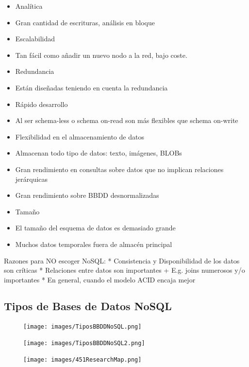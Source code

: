\documentclass[]{book}
\providecommand{\tightlist}{%
  \setlength{\itemsep}{0pt}\setlength{\parskip}{0pt}}
\begin{document}
\begin{itemize}
\tightlist
\item
  Analítica
\item
  Gran cantidad de escrituras, análisis en bloque
\item
  Escalabilidad
\item
  Tan fácil como añadir un nuevo nodo a la red, bajo coste.
\item
  Redundancia
\item
  Están diseñadas teniendo en cuenta la redundancia
\item
  Rápido desarrollo
\item
  Al ser schema-less o schema on-read son más flexibles que schema
  on-write
\item
  Flexibilidad en el almacenamiento de datos
\item
  Almacenan todo tipo de datos: texto, imágenes, BLOBs
\item
  Gran rendimiento en consultas sobre datos que no implican relaciones
  jerárquicas
\item
  Gran rendimiento sobre BBDD desnormalizadas
\item
  Tamaño
\item
  El tamaño del esquema de datos es demasiado grande
\item
  Muchos datos temporales fuera de almacén principal
\end{itemize}

Razones para NO escoger NoSQL: * Consistencia y Disponibilidad de los
datos son críticas * Relaciones entre datos son importantes + E.g. joins
numerosos y/o importantes * En general, cuando el modelo ACID encaja
mejor

\subsection{Tipos de Bases de Datos
NoSQL}\label{tipos-de-bases-de-datos-nosql}

\begin{figure}
\centering
\texttt{[image: images/TiposBBDDNoSQL.png]}
\caption{}
\end{figure}

\begin{figure}
\centering
\texttt{[image: images/TiposBBDDNoSQL2.png]}
\caption{}
\end{figure}

\begin{figure}
\centering
\texttt{[image: images/451ResearchMap.png]}
\caption{}
\end{figure}
\end{document}
